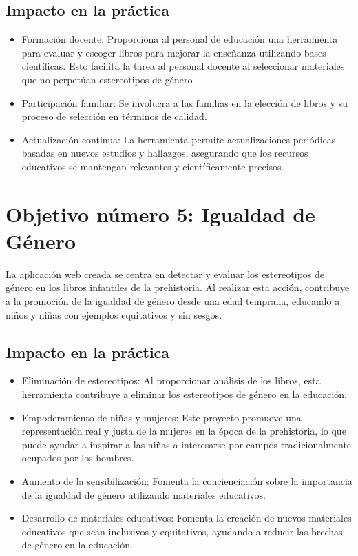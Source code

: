 \subsection{Impacto en la práctica}
\begin{itemize}
    \item Formación docente: Proporciona al personal de educación una herramienta para evaluar y escoger libros para mejorar la enseñanza utilizando bases científicas. Esto facilita la tarea al personal docente al seleccionar materiales que no perpetúan estereotipos de género
    \item Participación familiar: Se involucra a las familias en la elección de libros y su proceso de selección en términos de calidad.
    \item Actualización continua: La herramienta permite actualizaciones periódicas basadas en nuevos estudios y hallazgos, asegurando que los recursos educativos se mantengan relevantes y científicamente precisos.
\end{itemize}

\section{Objetivo número 5: Igualdad de Género}
La aplicación web creada se centra en detectar y evaluar los estereotipos de género en los libros infantiles de la prehistoria. Al realizar esta acción, contribuye a la promoción de la igualdad de género desde una edad temprana, educando a niños y niñas con ejemplos equitativos y sin sesgos.

\subsection{Impacto en la práctica}
\begin{itemize}
    \item Eliminación de estereotipos: Al proporcionar análisis de los libros, esta herramienta contribuye a eliminar los estereotipos de género en la educación.
    \item Empoderamiento de niñas y mujeres: Este proyecto promueve una representación real y justa de la mujeres en la época de la prehistoria, lo que puede ayudar a inspirar a las niñas a interesarse por campos tradicionalmente ocupados por los hombres.
    \item Aumento de la sensibilización: Fomenta la concienciación sobre la importancia de la igualdad de género utilizando materiales educativos.
    \item Desarrollo de materiales educativos: Fomenta la creación de nuevos materiales educativos que sean inclusivos y equitativos, ayudando a reducir las brechas de género en la educación.
\end{itemize}


